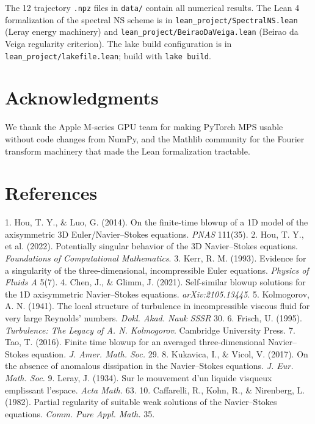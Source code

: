 \documentclass[11pt]{article}
\begin{document}
The 12 trajectory \texttt{.npz} files in \texttt{data/} contain all numerical
results. The Lean 4 formalization of the spectral NS scheme is in
\texttt{lean\_project/SpectralNS.lean} (Leray energy machinery) and
\texttt{lean\_project/BeiraoDaVeiga.lean} (Beirao da Veiga regularity
criterion). The lake build configuration is in
\texttt{lean\_project/lakefile.lean}; build with \texttt{lake build}.


\section{Acknowledgments}

We thank the Apple M-series GPU team for making PyTorch MPS usable
without code changes from NumPy, and the Mathlib community for the
Fourier transform machinery that made the Lean formalization tractable.

\hrulefill


\section{References}

1. Hou, T. Y., \& Luo, G. (2014). On the finite-time blowup of a 1D model
   of the axisymmetric 3D Euler/Navier–Stokes equations. \textit{PNAS} 111(35).
2. Hou, T. Y., et al. (2022). Potentially singular behavior of the 3D
   Navier–Stokes equations. \textit{Foundations of Computational Mathematics}.
3. Kerr, R. M. (1993). Evidence for a singularity of the three-dimensional,
   incompressible Euler equations. \textit{Physics of Fluids A} 5(7).
4. Chen, J., \& Glimm, J. (2021). Self-similar blowup solutions for the 1D
   axisymmetric Navier–Stokes equations. \textit{arXiv:2105.13445}.
5. Kolmogorov, A. N. (1941). The local structure of turbulence in
   incompressible viscous fluid for very large Reynolds' numbers. \textit{Dokl.
   Akad. Nauk SSSR} 30.
6. Frisch, U. (1995). \textit{Turbulence: The Legacy of A. N. Kolmogorov}.
   Cambridge University Press.
7. Tao, T. (2016). Finite time blowup for an averaged three-dimensional
   Navier–Stokes equation. \textit{J. Amer. Math. Soc.} 29.
8. Kukavica, I., \& Vicol, V. (2017). On the absence of anomalous dissipation
   in the Navier–Stokes equations. \textit{J. Eur. Math. Soc.}
9. Leray, J. (1934). Sur le mouvement d'un liquide visqueux emplissant
   l'espace. \textit{Acta Math.} 63.
10. Caffarelli, R., Kohn, R., \& Nirenberg, L. (1982). Partial regularity of
    suitable weak solutions of the Navier–Stokes equations. \textit{Comm. Pure
    Appl. Math.} 35.
\end{document}
